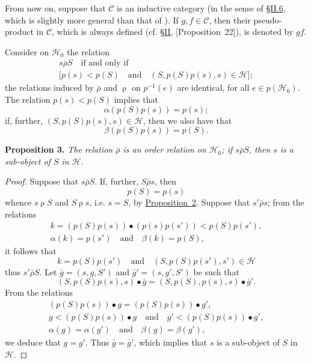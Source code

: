 \documentclass[a4paper,oneside,nobib,nofonts,notitlepage,notoc,nols,fleqn,justified]{tufte-book}
\newenvironment{itenv}[1]
  {\phantomsection\par\medskip\noindent\textbf{#1.}\itshape}
  {\par\medskip}
\newcommand{\oldpage}[1]{{\reversemarginpar\marginnote{\raggedleft\footnotesize\textit{p.~#1}}}}
\newcommand{\CC}{\mathcal{C}}
\newcommand{\HH}{\mathcal{H}}
\newcommand{\relrho}{\mathrel{\rho}}
\newcommand{\relrhobar}{\mathrel{\bar{\rho}}}
\begin{document}
From now on, suppose that $\CC$ is an inductive category (in the sense of \hyperref[section:ii.6]{§II.6}, which is slightly more general than that of \cite{3c}).
If $g,f\in\CC$, then their pseudo-product in $\CC$, which is always defined (cf. \hyperref[section:ii]{§II}, \hyperref[proposition:i-22][Proposition~22]), is denoted by $gf$.

Consider on $\HH_0$ the relation
\[
  \begin{gathered}
    s\relrhobar S
    \quad\text{if and only if}\quad
  \\\big[p(s)<p(S)
    \quad\text{and}\quad
    (S,p(S)p(s),s)\in\HH\big];
  \end{gathered}
\]
the relations induced by $\relrhobar$ and $\relrho$ on $p^{-1}(e)$ are identical, for all $e\in p(\HH_0)$.
The relation $p(s)<p(S)$ implies that
\[
  \alpha(p(S)p(s))
  = p(s);
\]
if, further, $(S,p(S)p(s),s)\in\HH$, then we also have that
\[
  \beta(p(S)p(s))
  = p(S).
\]

\begin{itenv}{Proposition 3}
\label{proposition:i-3}
  The relation $\relrhobar$ is an order relation on $\HH_0$;
  if $s\relrhobar S$, then $s$ is a sub-object \cite{5} of $S$ in $\HH$.
\end{itenv}

\begin{proof}
  Suppose that $s\relrhobar S$.
  If, further, $S\relrhobar s$, then
  \[
    p(S)=p(s)
  \]
  whence $s\relrho S$ and $S\relrho s$, i.e. $s=S$, by \hyperref[Proposition~2]{Proposition~2}.
  Suppose that $s'\relrhobar s$;
  from the relations
  \[
    \begin{gathered}
      k = (p(S)p(s))\bullet(p(s)p(s'))
      < p(S)p(s'),
    \\\alpha(k)=p(s')
      \quad\text{and}\quad
      \beta(k)=p(S),
    \end{gathered}
  \]
  it follows that
  \[
    k=p(S)p(s')
    \quad\text{and}\quad
    (S,p(S)p(s'),s')\in\HH
  \]
  thus $s'\relrhobar S$.
  \oldpage{360}
  Let $\bar{g}=(s,g,S')$ and $\bar{g}'=(s,g',S')$ be such that
  \[
    (S,p(S)p(s),s)\bullet\bar{g}
    = (S,p(S),p(s),s)\bullet\bar{g}'.
  \]
  From the relations
  \[
    \begin{gathered}
      (p(S)p(s))\bullet g = (p(S)p(s))\bullet g',
    \\g < (p(S)p(s))\bullet g
      \quad\text{and}\quad
      g' < (p(S)p(s))\bullet g',
    \\\alpha(g)=\alpha(g')
      \quad\text{and}\quad
      \beta(g)=\beta(g'),
    \end{gathered}
  \]
  we deduce that $g=g'$.
  Thus $\bar{g}=\bar{g}'$, which implies that $s$ is a sub-object of $S$ in $\HH$.
\end{proof}
\end{document}
